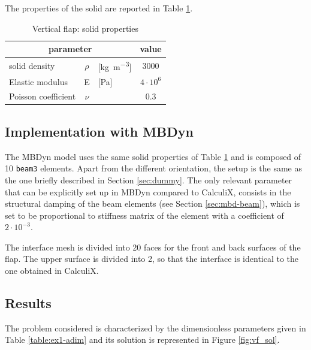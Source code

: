 The properties of the solid are reported in Table \ref{table:ex1-solid}.

\begin{table}[!htb]
	\begin{center}
		\begin{tabular}{ l c  l | c } 
			\multicolumn{3}{c|}{parameter} & value   \\ 
			\hline
			solid density  & $\rho$ & [\si{kg.m^{-3}}] & 3000    \\
			Elastic modulus  & E & [\si{Pa}] & $4\cdot 10^6$    \\
			Poisson coefficient & $\nu$ & & $0.3$  \\
		\end{tabular}
	\end{center}
	\caption{Vertical flap: solid properties}
	\label{table:ex1-solid}
\end{table}

 
\subsection{Implementation with MBDyn}


The MBDyn model uses the same solid properties of Table \ref{table:ex1-solid} and is composed of 10 \texttt{beam3} elements. Apart from the different orientation, the setup is the same as the one briefly described in Section \ref{sec:dummy}. The only relevant parameter that can be explicitly set up in MBDyn compared to CalculiX, consists in the structural damping of the beam elements (see Section \ref{sec:mbd-beam}), which is set to be proportional to stiffness matrix of the element with a coefficient of $2\cdot10^{-3}$.

The interface mesh is divided into 20 faces for the front and back surfaces of the flap. The upper surface is divided into 2, so that the interface is identical to the one obtained in CalculiX. 



\subsection{Results}

The problem considered is characterized by the dimensionless parameters given in Table \ref{table:ex1-adim} and its solution is represented in Figure \ref{fig:vf_sol}.


